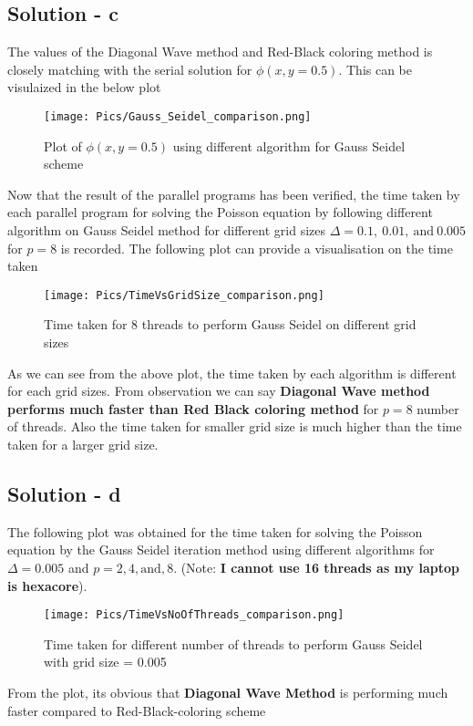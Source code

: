 \documentclass[12pt]{article}
\begin{document}
\subsection*{Solution - c}

\noindent The values of the Diagonal Wave method and Red-Black coloring method is closely matching with the serial solution for $\phi(x,y=0.5)$. This can be visulaized in the below plot
\begin{figure}[!ht]
\vspace{-5mm}

    \centering
    \texttt{[image: Pics/Gauss\_Seidel\_comparison.png]}
    \caption{Plot of $\phi(x,y=0.5)$ using different algorithm for Gauss Seidel scheme}
    \label{fig:GS_compare}
\end{figure}


\noindent Now that the result of the parallel programs has been verified, the time taken by each parallel program for solving the Poisson equation by following different algorithm on Gauss Seidel method for different grid sizes $\Delta = 0.1, \ 0.01, \  \text{and} \ 0.005 $ for $p = 8$ is recorded. The following plot can provide a visualisation on the time taken
\begin{figure}[!ht]
    \centering
    \texttt{[image: Pics/TimeVsGridSize\_comparison.png]}
    \caption{Time taken for 8 threads to perform Gauss Seidel on different grid sizes}
    \label{fig:GS_grid_time}
\end{figure}

\vspace{-5mm}
\noindent As we can see from the above plot, the time taken by each algorithm is different for each grid sizes. From observation we can say \textbf{Diagonal Wave method performs much faster than Red Black coloring method} for $p =8$ number of threads. Also the time taken for smaller grid size is much higher than the time taken for a larger grid size.

\subsection*{Solution - d}
The following plot was obtained for the time taken for solving the Poisson equation by the Gauss Seidel iteration method using different algorithms for $\Delta = 0.005$ and $p=2,4, \text{and}, 8$. (Note: \textbf{I cannot use 16 threads as my laptop is hexacore}).

\begin{figure}[!ht]
    \centering
    \texttt{[image: Pics/TimeVsNoOfThreads\_comparison.png]}
    \caption{Time taken for different number of  threads to perform Gauss Seidel with grid size = 0.005}
    \label{fig:GS_thread_time}
\end{figure}

\noindent From the plot, its obvious that \textbf{Diagonal Wave Method} is performing much faster compared to Red-Black-coloring scheme
\end{document}
